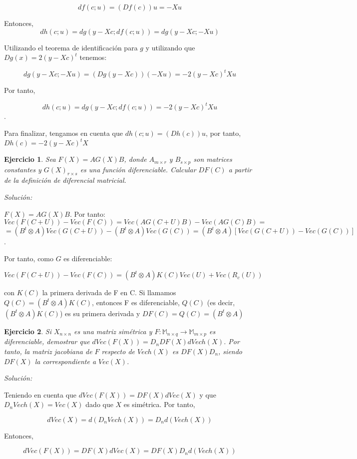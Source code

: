 \documentclass{article}
\theoremstyle{theorem-style}  %
\theoremstyle{definition-style}
\theoremstyle{example-style}
\theoremstyle{exercise-style}
\newtheorem{exercise}{Ejercicio}[section]
\begin{document}
	$$ df(c;u) = (Df(c))u = -X u$$
	
	Entonces,
	$$  dh(c;u) = dg(y - Xc; df(c;u)) = dg( y -Xc; -Xu)$$
	
	
	Utilizando el teorema de identificación para $g$ y utilizando que $Dg(x) = 2(y- Xc)^t$  tenemos:
	
	$$ dg(y - Xc ; -Xu) = (Dg(y - Xc))(-Xu) =  -2 (y - Xc)^t Xu$$
	
	Por tanto,
	
	$$ dh(c;u) = dg(y - Xc; df(c;u)) = -2(y - Xc)^tXu$$.
	
	Para finalizar, tengamos en cuenta que $dh(c;u) = (Dh(c))u$, por tanto, $Dh(c) = -2(y - Xc)^tX$
	
	\begin{exercise}
		Sea $F(X)=AG(X)B$, donde $A_{m\times r}$ y $B_{s\times p}$ son matrices constantes y $G(X)_{r\times s}$ es una función diferenciable. Calcular $DF(C)$ a partir de la definición de diferencial matricial.
	\end{exercise}
	\textit{Solución:}
	
	$F(X) = AG(X)B$. Por tanto:
	$$ Vec(F(C+U)) - Vec(F(C)) = Vec(AG(C+U)B) - Vec(AG(C)B) = $$
	$$ = (B^t\otimes A)Vec(G(C+U)) - (B^t\otimes A)Vec(G(C)) = (B^t\otimes A)[Vec(G(C+U))-Vec(G(C))]$$.
	
	Por tanto, como $G$ es diferenciable:
	
	$$ Vec(F(C+U)) - Vec(F(C)) = (B^t\otimes A)K(C)Vec(U) +Vec(R_c(U))$$
	
	con $K(C)$ la primera derivada de F en C. Si llamamos $Q(C)=(B^t \otimes A) K(C)$, entonces F es diferenciable, $Q(C)$ (es decir, $(B^t\otimes A)K(C)$) es su primera derivada y $DF(C)=Q(C) = (B^t\otimes A)$
	
	\begin{exercise}
		Si $X_{n\times n}$ es una matriz simétrica y $F: \mathbb{M}_{n\times q} \rightarrow \mathbb{M}_{m\times p}$ es diferenciable, demostrar que $dVec(F(X)) = D_nDF(X)dVech(X)$. Por tanto, la matriz jacobiana de $F$ respecto de $Vech(X)$ es $DF(X)D_n$, siendo $DF(X)$ la correspondiente a $Vec(X)$.
		
	\end{exercise}
	\textit{Solución:}
	
	Teniendo en cuenta que $dVec(F(X)) = DF(X) dVec(X)$ y que $D_n Vech(X) = Vec(X)$ dado que $X$ es simétrica. Por tanto,
	
	$$ dVec(X) = d(D_n Vech(X)) = D_n d(Vech(X))$$
	
	Entonces,
	
	$$d Vec (F(X)) = DF(X) d Vec(X) = DF(X)D_n d(Vech(X))$$
	
\end{document}
